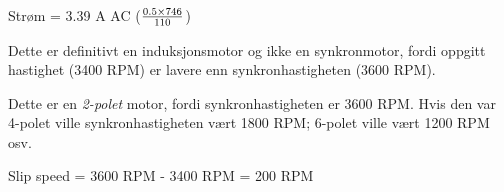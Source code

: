Strøm = 3.39 A AC ($0.5 \times 746 \over 110$)

\vskip 10pt

Dette er definitivt en induksjonsmotor og ikke en synkronmotor, fordi oppgitt hastighet (3400 RPM) er lavere enn synkronhastigheten (3600 RPM).
 
\vskip 10pt

Dette er en {\it 2-polet} motor, fordi synkronhastigheten er 3600 RPM. Hvis den var 4-polet ville synkronhastigheten vært 1800 RPM; 6-polet ville vært 1200 RPM osv.

\vskip 10pt

Slip speed = 3600 RPM - 3400 RPM = 200 RPM




